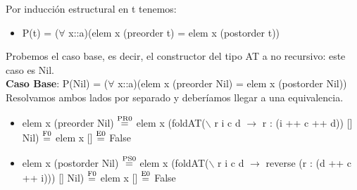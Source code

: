 \documentclass{article}
\begin{document}
Por inducción estructural en t tenemos: 
\begin{itemize}
    \item P(t) = ($\forall$ x::a)(elem x (preorder t) = elem x (postorder t))
\end{itemize}

Probemos el caso base, es decir, el constructor del tipo AT a no recursivo: este caso es Nil. \\ 
\textbf{Caso Base}: P(Nil) = ($\forall$ x::a)(elem x (preorder Nil) = elem x (postorder Nil)) \\ 
Resolvamos ambos lados por separado y deberíamos llegar a una equivalencia. 

\begin{itemize}
    \item elem x (preorder Nil) $\stackrel{\text{PR0}}{=}$ elem x (foldAT($\backslash$ r i c d $\rightarrow$ r : (i ++ c ++ d)) [] Nil) $\stackrel{\text{F0}}{=}$ elem x [] $\stackrel{\text{E0}}{=}$ False
    \item elem x (postorder Nil) $\stackrel{\text{PS0}}{=}$ elem x (foldAT($\backslash$ r i c d $\rightarrow$ reverse (r : (d ++ c ++ i))) [] Nil) $\stackrel{\text{F0}}{=}$ elem x [] $\stackrel{\text{E0}}{=}$ False
\end{itemize}
\end{document}
